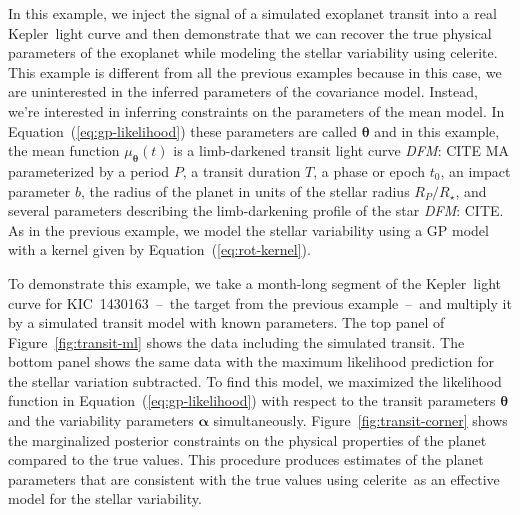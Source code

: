 \documentclass[manuscript, letterpaper]{aastex6}
\makeatletter
\let\origsubsection\subsection
\renewcommand\subsection{\@ifstar{\starsubsection}{\nostarsubsection}}
\newcommand\nostarsubsection[1]{\subsectionprelude\origsubsection{#1}}
\newcommand\starsubsection[1]{\subsectionprelude\origsubsection*{#1}}
\newcommand\subsectionprelude{\vspace{1em}}
\newcommand{\project}[1]{\textsf{#1}}
\newcommand{\kepler}{\project{Kepler}}
\newcommand{\celerite}{\project{celerite}}
\newcommand{\figureref}[1]{\ref{fig:#1}}
\newcommand{\Figure}[1]{Figure~\figureref{#1}}
\renewcommand{\eqref}[1]{\ref{eq:#1}}
\newcommand{\Eq}[1]{Equation~(\eqref{#1})}
\newcommand{\eq}[1]{\Eq{#1}}
\newcommand{\bvec}[1]{{\ensuremath{\boldsymbol{#1}}}}
\newcommand{\todo}[3]{{\color{#2}\emph{#1}: #3}}
\newcommand{\dfmtodo}[1]{\todo{DFM}{red}{#1}}
\makeatother
\begin{document}
\subsection{Exoplanet transit fitting}

In this example, we inject the signal of a simulated exoplanet transit into a
real \kepler\ light curve and then demonstrate that we can recover the true
physical parameters of the exoplanet while modeling the stellar variability
using \celerite.
This example is different from all the previous examples because in this case,
we are uninterested in the inferred parameters of the covariance model.
Instead, we're interested in inferring constraints on the parameters of the
mean model.
In \eq{gp-likelihood} these parameters are called $\bvec{\theta}$ and in this
example, the mean function $\mu_\bvec{\theta}(t)$ is a limb-darkened transit
light curve \dfmtodo{CITE MA} parameterized by a period $P$, a transit
duration $T$, a phase or epoch $t_0$, an impact parameter $b$, the radius
of the planet in units of the stellar radius $R_P/R_\star$, and several
parameters describing the limb-darkening profile of the star \dfmtodo{CITE}.
As in the previous example, we model the stellar variability using a GP model
with a kernel given by \eq{rot-kernel}.

To demonstrate this example, we take a month-long segment of the \kepler\
light curve for KIC~1430163~--~the target from the previous example~--~and
multiply it by a simulated transit model with known parameters.
The top panel of \Figure{transit-ml} shows the data including the simulated
transit.
The bottom panel shows the same data with the maximum likelihood prediction
for the stellar variation subtracted.
To find this model, we maximized the likelihood function in \eq{gp-likelihood}
with respect to the transit parameters $\bvec{\theta}$ and the variability
parameters $\bvec{\alpha}$ simultaneously.
\Figure{transit-corner} shows the marginalized posterior constraints on the
physical properties of the planet compared to the true values.
This procedure produces estimates of the planet parameters that are consistent
with the true values using \celerite\ as an effective model for the stellar
variability.
\end{document}
